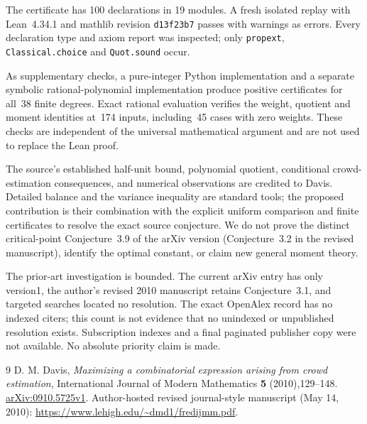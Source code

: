 \documentclass[11pt]{article}
\begin{document}
The certificate has 100 declarations in 19 modules. A fresh isolated replay
with Lean~4.34.1 and mathlib revision \texttt{d13f23b7} passes with
warnings as errors. Every declaration type and axiom report was inspected;
only \texttt{propext}, \texttt{Classical.choice} and \texttt{Quot.sound}
occur.

As supplementary checks, a pure-integer Python implementation and a
separate symbolic rational-polynomial implementation produce positive
certificates for all~38 finite degrees. Exact rational evaluation verifies
the weight, quotient and moment identities at~174 inputs, including~45
cases with zero weights. These checks are independent of the universal
mathematical argument and are not used to replace the Lean proof.

The source's established half-unit bound, polynomial quotient,
conditional crowd-estimation consequences, and numerical observations
are credited to Davis. Detailed balance and the variance inequality are
standard tools; the proposed contribution is their combination with the
explicit uniform comparison and finite certificates to resolve the exact
source conjecture. We do not prove the distinct critical-point
Conjecture~3.9 of the arXiv version (Conjecture~3.2 in the revised
manuscript), identify the optimal constant, or claim new general
moment theory.

The prior-art investigation is bounded. The current arXiv entry has
only version1, the author's revised 2010 manuscript retains Conjecture~3.1,
and targeted searches located no resolution. The exact OpenAlex record
has no indexed citers; this count is not evidence that no unindexed or
unpublished resolution exists. Subscription indexes and a final paginated
publisher copy were not available. No absolute priority claim is made.

\begin{thebibliography}{9}
 D. M. Davis, \emph{Maximizing a combinatorial expression
arising from crowd estimation}, International Journal of Modern
Mathematics \textbf{5} (2010),129--148.
\href{https://arxiv.org/abs/0910.5725v1}{arXiv:0910.5725v1}.
Author-hosted revised journal-style manuscript (May 14, 2010):
\url{https://www.lehigh.edu/~dmd1/fredijmm.pdf}.
\end{thebibliography}
\end{document}

